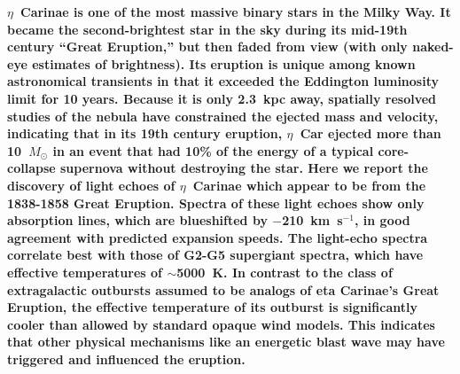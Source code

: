 {\bf 
$\eta$~Carinae is one of the most massive binary stars  in the
Milky Way\cite{DH97,Damineli96}. It became the second-brightest star
in the sky during its mid-19th century ``Great Eruption,'' but then
faded from view (with only
naked-eye estimates of brightness\cite{Frew04,SF11}).
Its eruption is unique among known astronomical transients in that it
exceeded the Eddington luminosity limit for 10 years.
Because it is only 2.3~kpc away, spatially resolved studies of the
nebula have constrained the ejected mass and velocity, indicating that
in its 19th century eruption, $\eta$~Car ejected more than
10~$M_{\odot}$ in an event that had 10\% of the energy of a typical
core-collapse supernova\cite{Smith03,Smith08} without destroying the
star.
%
Here we report the discovery of light echoes of $\eta$~Carinae which
appear to be from the 1838-1858 Great Eruption.  
Spectra of these light echoes show only absorption lines, which are
blueshifted by $-$210~km~s$^{-1}$, in good agreement with predicted
expansion speeds\cite{Smith08}.
The light-echo spectra correlate best with those of G2-G5 supergiant
spectra, which have effective temperatures of $\sim$5000~K.  In
contrast to the class of extragalactic outbursts assumed to be analogs
of eta Carinae's Great
Eruption\cite{Goodrich89,Humphreys94,Humphreys99,VanDyk00,Vink09,Kashi10_ngc300},
the effective temperature of its outburst is significantly cooler than
allowed by standard opaque wind models\cite{Davidson87}.  This
indicates that other physical mechanisms like an energetic blast wave
may have triggered and influenced the eruption.
}

\medskip



